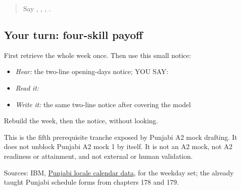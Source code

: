 \label{lesson:PA-C182-payoff}



\begin{quote}
Say \textbf{}, \textbf{}, \textbf{}, \textbf{}.
\end{quote}

\subsection*{Your turn: four-skill payoff}
First retrieve the whole week once. Then use this small notice:

\begin{quote}
\textbf{        }
\end{quote}

\begin{itemize}
\raggedright
  \item \emph{Hear:} the two-line opening-days notice; YOU SAY: \textbf{        }
  \item \emph{Read it:} \textbf{        }
  \item \emph{Write it:} the same two-line notice after covering the model
\end{itemize}

\begin{tcolorbox}[breakable,colback=teal!4,colframe=teal!35!black,title={Before you move on}]
Rebuild the week, then the notice, without looking.

This is the fifth prerequisite tranche exposed by Punjabi A2 mock drafting. It does not unblock Punjabi A2 mock 1 by itself. It is not an A2 mock, not A2 readiness or attainment, and not external or human validation.

Sources: IBM, \href{https://public.dhe.ibm.com/software/globalization/documents/India-Punjabi\_Calendar.pdf}{Punjabi locale calendar data}, for the weekday set; the already taught Punjabi schedule forms from chapters 178 and 179.
\end{tcolorbox}
